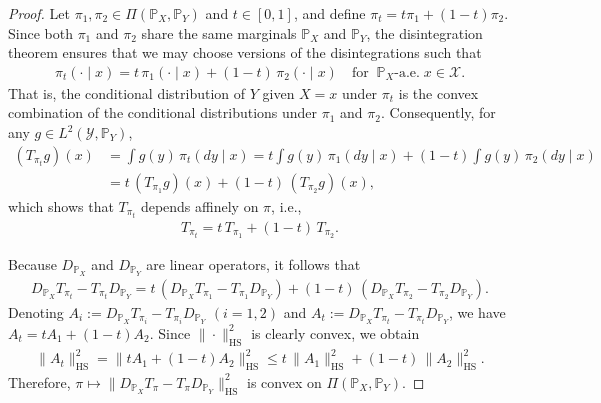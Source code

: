 \documentclass{article}
\theoremstyle{plain}
\theoremstyle{definition}
\theoremstyle{remark}
\begin{document}
\begin{proof}
	Let $\pi_1,\pi_2 \in \Pi(\mathbb{P}_X,\mathbb{P}_Y)$ and $t \in [0,1]$, and define $\pi_t = t\pi_1 + (1-t)\pi_2$. Since both $\pi_1$ and $\pi_2$ share the same marginals $\mathbb{P}_X$ and $\mathbb{P}_Y$, the disintegration theorem ensures that we may choose versions of the disintegrations such that
	\begin{align*}
		\pi_t(\cdot \mid x) = t\,\pi_1(\cdot \mid x) + (1-t)\,\pi_2(\cdot \mid x)
		\quad \text{for} \;\; \mathbb{P}_X\text{-a.e.} \; x \in \mathcal{X}.
	\end{align*}
	That is, the conditional distribution of $Y$ given $X=x$ under $\pi_t$ is the convex combination of the conditional distributions under $\pi_1$ and $\pi_2$. 
	Consequently, for any $g \in L^2(\mathcal{Y},\mathbb{P}_Y)$,
	\begin{align*}
		(T_{\pi_t} g)(x)
		&= \int g(y)\,\pi_t(dy \mid x)
		= t \int g(y)\,\pi_1(dy \mid x) + (1-t)\int g(y)\,\pi_2(dy \mid x) \\
		&= t\,(T_{\pi_1}g)(x) + (1-t)\,(T_{\pi_2}g)(x),
	\end{align*}
	which shows that $T_{\pi_t}$ depends affinely on $\pi$, i.e.,
	\begin{align*}
		T_{\pi_t} = t\,T_{\pi_1} + (1-t)\,T_{\pi_2}.
	\end{align*}
	
	Because $D_{\mathbb{P}_X}$ and $D_{\mathbb{P}_Y}$ are linear operators, it follows that
	\begin{align*}
		D_{\mathbb{P}_X}T_{\pi_t} - T_{\pi_t}D_{\mathbb{P}_Y}
		= t\,(D_{\mathbb{P}_X}T_{\pi_1} - T_{\pi_1}D_{\mathbb{P}_Y})
		+ (1-t)\,(D_{\mathbb{P}_X}T_{\pi_2} - T_{\pi_2}D_{\mathbb{P}_Y}).
	\end{align*}
	Denoting $A_i := D_{\mathbb{P}_X}T_{\pi_i} - T_{\pi_i}D_{\mathbb{P}_Y}$ $(i=1,2)$ and $A_t := D_{\mathbb{P}_X}T_{\pi_t} - T_{\pi_t}D_{\mathbb{P}_Y}$, 
	we have $A_t = tA_1 + (1-t)A_2$. 
	Since $\|\cdot\|_{\mathrm{HS}}^2$ is clearly convex, we obtain
	\begin{align*}
		\|A_t\|_{\mathrm{HS}}^2
		= \|tA_1 + (1-t)A_2\|_{\mathrm{HS}}^2
		\le t\,\|A_1\|_{\mathrm{HS}}^2 + (1-t)\,\|A_2\|_{\mathrm{HS}}^2.
	\end{align*}
	Therefore, $\pi \mapsto \|D_{\mathbb{P}_X}T_\pi - T_\pi D_{\mathbb{P}_Y}\|_{\mathrm{HS}}^2$ is convex on $\Pi(\mathbb{P}_X,\mathbb{P}_Y)$. 
\end{proof}
\end{document}
